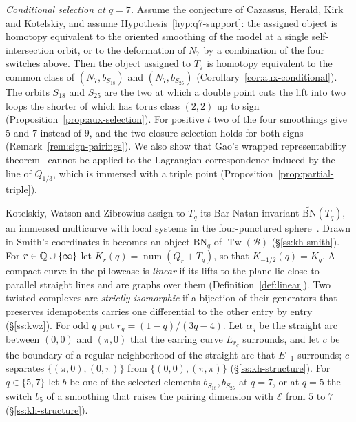 \emph{Conditional selection at $q=7$.} Assume the conjecture of Cazassus, Herald, Kirk and Kotelskiy, and
assume Hypothesis~\ref{hyp:q7-support}: the assigned object is homotopy equivalent to the oriented smoothing
of the model at a single self-intersection orbit, or to the deformation of $N_7$ by a combination of the four
switches above.
Then the object assigned to $T_7$ is homotopy equivalent to the common class of $(N_7,b_{S_{18}})$ and
$(N_7,b_{S_{25}})$ (Corollary~\ref{cor:aux-conditional}). The orbits $S_{18}$ and $S_{25}$ are the two at
which a double point cuts the lift into two loops the shorter of which has torus class $(2,2)$ up to sign
(Proposition~\ref{prop:aux-selection}). For positive $t$ two of the four smoothings give $5$ and $7$ instead
of $9$, and the two-closure selection holds for both signs (Remark~\ref{rem:sign-pairings}). We also show that Gao's wrapped representability
theorem~\cite{Gao} cannot be applied to the Lagrangian correspondence induced by the line of $Q_{1/3}$,
which is immersed with a triple point (Proposition~\ref{prop:partial-triple}).

Kotelskiy, Watson and Zibrowius assign to $T_q$ its Bar-Natan invariant $\widetilde{\mathrm{BN}}(T_q)$, an
immersed multicurve with local systems in the four-punctured sphere~\cite{KWZ}. Drawn in Smith's
coordinates it becomes an object $\mathrm{BN}_q$ of $\operatorname{Tw}(\mathcal B)$ (\S\ref{ss:kh-smith}).
For $r\in\mathbb{Q}\cup\{\infty\}$ let $K_r(q)=\operatorname{num}(Q_r+T_q)$, so that $K_{-1/2}(q)=K_q$. A compact
curve in the pillowcase is \emph{linear} if its lifts to the plane lie close to parallel straight lines and
are graphs over them (Definition~\ref{def:linear}). Two twisted complexes are \emph{strictly isomorphic} if
a bijection of their generators that preserves idempotents carries one differential to the other entry by
entry (\S\ref{ss:kwz}). For odd $q$ put $r_q=(1-q)/(3q-4)$. Let $\alpha_q$ be the straight arc between
$(0,0)$ and $(\pi,0)$ that the earring curve $E_{r_q}$ surrounds, and let $c$ be the boundary of a regular
neighborhood of the straight arc that $E_{-1}$ surrounds; $c$ separates $\{(\pi,0),(0,\pi)\}$ from
$\{(0,0),(\pi,\pi)\}$ (\S\ref{ss:kh-structure}). For $q\in\{5,7\}$ let $b$ be one of the selected elements
$b_{S_{18}},b_{S_{25}}$ at $q=7$, or at $q=5$ the switch $b_5$ of a smoothing that raises the pairing
dimension with $\mathcal E$ from $5$ to $7$ (\S\ref{ss:kh-structure}).


